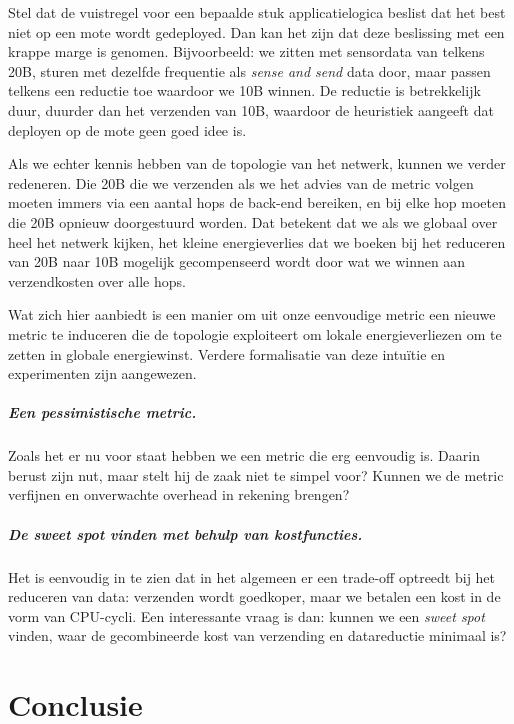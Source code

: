 \documentclass{article}
\begin{document}
Stel dat de vuistregel voor een bepaalde stuk applicatielogica beslist dat het
best niet op een mote wordt gedeployed. Dan kan het zijn dat deze beslissing met
een krappe marge is genomen. Bijvoorbeeld: we zitten met sensordata van telkens
20B, sturen met dezelfde frequentie als \textit{sense and send} data door, maar
passen telkens een reductie toe waardoor we 10B winnen. De reductie is
betrekkelijk duur, duurder dan het verzenden van 10B, waardoor de heuristiek
aangeeft dat deployen op de mote geen goed idee is. 

Als we echter kennis hebben van de topologie van het netwerk, kunnen we verder
redeneren. Die 20B die we verzenden als we het advies van de metric volgen
moeten immers via een aantal hops de back-end bereiken, en bij elke hop moeten
die 20B opnieuw doorgestuurd worden. Dat betekent dat we als we globaal over
heel het netwerk kijken, het kleine energieverlies dat we boeken bij het
reduceren van 20B naar 10B mogelijk gecompenseerd wordt door wat we winnen aan
verzendkosten over alle hops.

Wat zich hier aanbiedt is een manier om uit onze eenvoudige metric een nieuwe
metric te induceren die de topologie exploiteert om lokale energieverliezen om
te zetten in globale energiewinst. Verdere formalisatie van deze intu\"itie en
experimenten zijn aangewezen.

\subparagraph{Een pessimistische metric.}

Zoals het er nu voor staat hebben we een metric die erg eenvoudig is. Daarin
berust zijn nut, maar stelt hij de zaak niet te simpel voor? Kunnen we de metric
verfijnen en onverwachte overhead in rekening brengen? 




\subparagraph{De \textit{sweet spot} vinden met behulp van kostfuncties.}

Het is eenvoudig in te zien dat in het algemeen er een trade-off optreedt
bij het reduceren van data: verzenden wordt goedkoper, maar we betalen een kost
in de vorm van CPU-cycli. Een interessante vraag is dan: kunnen we een
\textit{sweet spot} vinden, waar de gecombineerde kost van verzending en
datareductie minimaal is?


\section{Conclusie}
\end{document}
